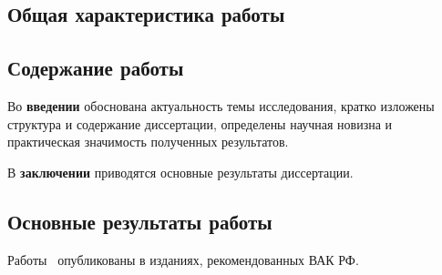 \subsection*{Общая характеристика работы}


\subsection*{Содержание работы}
Во \textbf{введении} обоснована  актуальность темы исследования, кратко изложены структура и содержание диссертации, определены научная новизна и практическая значимость полученных результатов.



В \textbf{заключении} приводятся основные результаты диссертации.
\subsection*{Основные результаты работы}


\renewcommand{\refname}{\Large Основные публикации по теме диссертации}
\nocite{*}


Работы~\cite{Kanischeva, Vorontsov_VSTU, Vorontsov_Compare, Vorontsov_PI} опубликованы в изданиях, рекомендованных ВАК РФ.